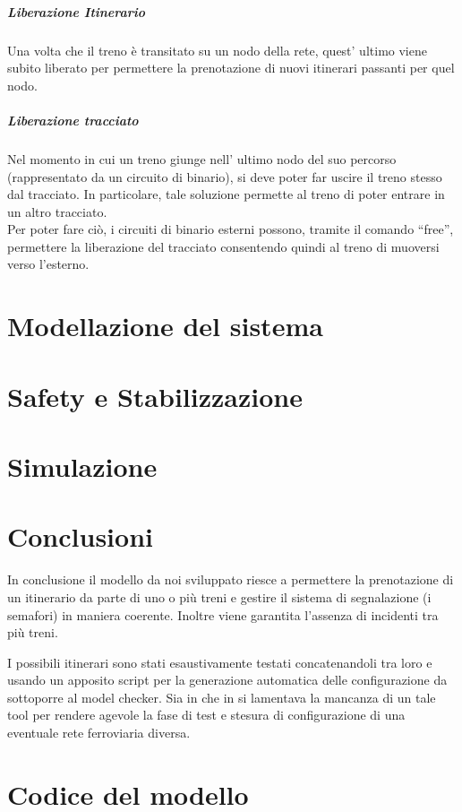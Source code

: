 \documentclass[10pt,a4paper,oneside]{report}
\begin{document}
\paragraph*{Liberazione Itinerario}
Una volta che il treno è transitato su un nodo della rete, quest' ultimo viene subito liberato per permettere la prenotazione di nuovi itinerari passanti per quel nodo.\\
\paragraph*{Liberazione tracciato}
Nel momento in cui un treno giunge nell' ultimo nodo del suo percorso (rappresentato da un circuito di binario), si deve poter far uscire il treno stesso dal tracciato.
In particolare, tale soluzione permette al treno di poter entrare in un altro tracciato.\\
Per poter fare ciò, i circuiti di binario esterni possono, tramite il comando ``free'', permettere la liberazione del tracciato consentendo quindi al treno di muoversi verso l'esterno.



\chapter{Modellazione del sistema}
\label{cap:modelling}

\chapter{Safety e Stabilizzazione}
\label{cap:properties}

\chapter{Simulazione}
\label{cap:simulation}

\chapter{Conclusioni}
\label{cap:conclusions}
In conclusione il modello da noi sviluppato riesce a permettere la prenotazione di un itinerario da parte di uno o più treni e gestire il sistema di segnalazione (i semafori) in maniera coerente. Inoltre viene garantita l'assenza di incidenti tra più treni. 

I possibili itinerari sono stati esaustivamente testati concatenandoli tra loro e usando un apposito script per la generazione automatica delle configurazione da sottoporre al model checker. Sia in \cite{Paolieri} che in \cite{RossettoRocciolo} si lamentava la mancanza di un tale tool per rendere agevole la fase di test e stesura di configurazione di una eventuale rete ferroviaria diversa.

\appendix


\chapter{Codice del modello}
\label{cap:code}


\end{document}
